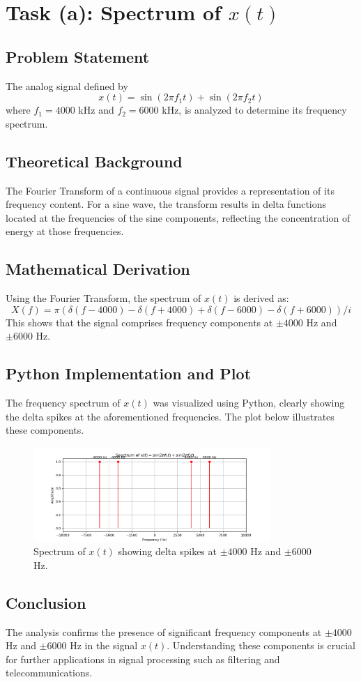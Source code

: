 
\item[(a)]
\section*{Task (a): Spectrum of \(x(t)\)}

\subsection*{Problem Statement}
The analog signal defined by
\[
x(t) = \sin(2\pi f_1 t) + \sin(2\pi f_2 t)
\]
where \(f_1 = 4000\) kHz and \(f_2 = 6000\) kHz, is analyzed to determine its frequency spectrum.

\subsection*{Theoretical Background}
The Fourier Transform of a continuous signal provides a representation of its frequency content. For a sine wave, the transform results in delta functions located at the frequencies of the sine components, reflecting the concentration of energy at those frequencies.

\subsection*{Mathematical Derivation}
Using the Fourier Transform, the spectrum of \(x(t)\) is derived as:
\[
X(f) = \pi \left(\delta(f - 4000) - \delta(f + 4000) + \delta(f - 6000) - \delta(f + 6000)\right) / i
\]
This shows that the signal comprises frequency components at \(\pm 4000\) Hz and \(\pm 6000\) Hz.

\subsection*{Python Implementation and Plot}
The frequency spectrum of \(x(t)\) was visualized using Python, clearly showing the delta spikes at the aforementioned frequencies. The plot below illustrates these components.

\begin{figure}[h]
    \centering
    \includegraphics[width=0.8\textwidth]{fig/ex1_a_spectrum.png}
    \caption{Spectrum of \(x(t)\) showing delta spikes at \(\pm 4000\) Hz and \(\pm 6000\) Hz.}
    \label{fig:spectrum}
\end{figure}

\subsection*{Conclusion}
The analysis confirms the presence of significant frequency components at \(\pm 4000\) Hz and \(\pm 6000\) Hz in the signal \(x(t)\). Understanding these components is crucial for further applications in signal processing such as filtering and telecommunications.
